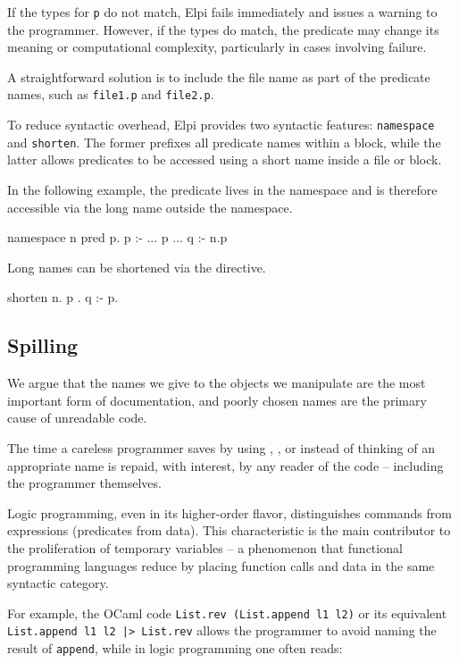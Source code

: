\documentclass[a4paper, 11pt]{book}
\begin{document}
If the types for \texttt{p} do not match, Elpi fails immediately and issues a
warning to the programmer. However, if the types do match, the predicate may
change its meaning or computational complexity, particularly in cases involving
failure.

A straightforward solution is to include the file name as part of the predicate
names, such as \texttt{file1.p} and \texttt{file2.p}.

To reduce syntactic overhead, Elpi provides two syntactic features:
\texttt{namespace} and \texttt{shorten}. The former prefixes all predicate
names within a block, while the latter allows predicates to be accessed using a
short name inside a file or block.

In the following example, the predicate  lives in the namespace
 and is therefore accessible via the long name  outside the
namespace.

\begin{elpicode}
namespace n {
  pred p.
  p :- ... p ...
}
q :- n.p
\end{elpicode}

Long names can be shortened via the  directive.

\begin{elpicode}
shorten n.{ p }. %
q :- p.
\end{elpicode}

\subsection{Spilling}\label{sec:spilling}


We argue that the names we give to the objects we manipulate are the most
important form of documentation, and poorly chosen names are the primary cause
of unreadable code.

The time a careless programmer saves by using , , or
 instead of thinking of an appropriate name is repaid, with
interest, by any reader of the code -- including the programmer themselves.

Logic programming, even in its higher-order flavor, distinguishes commands
from expressions (predicates from data). This characteristic is the main
contributor to the proliferation of temporary variables -- a phenomenon that
functional programming languages reduce by placing function calls and data in
the same syntactic category.

For example, the OCaml code \texttt{List.rev (List.append l1 l2)} or its
equivalent \texttt{List.append l1 l2 |> List.rev} allows the programmer to
avoid naming the result of \texttt{append}, while in logic programming one
often reads:
\end{document}

